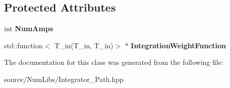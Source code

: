 \subsection*{Protected Attributes}
\begin{DoxyCompactItemize}
\item 
\hypertarget{class_c___integrator___path_ae229090f61dadfaec6eb74eea341de53}{int {\bfseries Num\-Amps}}\label{class_c___integrator___path_ae229090f61dadfaec6eb74eea341de53}

\item 
\hypertarget{class_c___integrator___path_aefd642a90c8bd5064c1c39c96e58756d}{std\-::function$<$ T\-\_\-in(T\-\_\-in, T\-\_\-in)$>$ $\ast$ {\bfseries Integration\-Weight\-Function}}\label{class_c___integrator___path_aefd642a90c8bd5064c1c39c96e58756d}

\end{DoxyCompactItemize}


The documentation for this class was generated from the following file\-:\begin{DoxyCompactItemize}
\item 
source/\-Num\-Libs/Integrator\-\_\-\-Path.\-hpp\end{DoxyCompactItemize}
